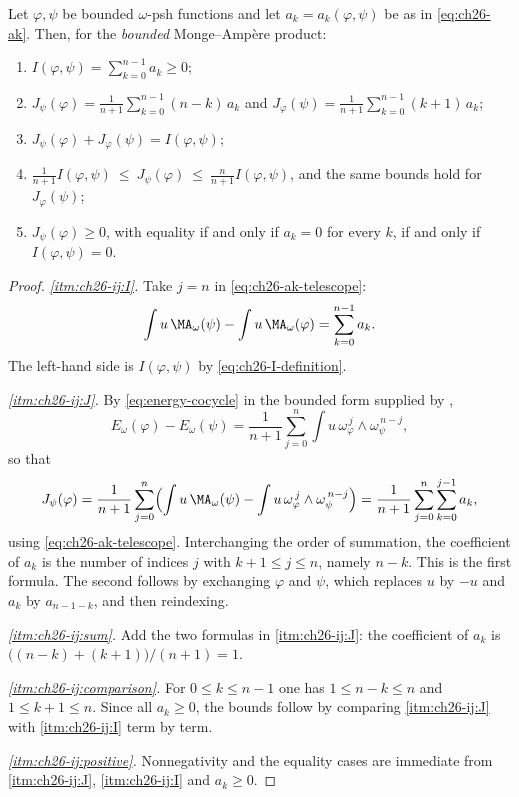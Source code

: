 \begin{theorem}
\label{thm:ch26-mixed-energy-identities}
Let \(\varphi,\psi\) be bounded \(\omega\)-psh functions and let
\(a_k=a_k(\varphi,\psi)\) be as in \eqref{eq:ch26-ak}.  Then, for the
\emph{bounded} Monge--Amp\`ere product:
\begin{enumerate}
\item\label{itm:ch26-ij:I}
 \(\displaystyle I(\varphi,\psi)=\sum_{k=0}^{n-1}a_k\geq0\);
\item\label{itm:ch26-ij:J}
 \(\displaystyle J_\psi(\varphi)=\frac1{n+1}\sum_{k=0}^{n-1}(n-k)\,a_k\)
 and
 \(\displaystyle J_\varphi(\psi)=\frac1{n+1}\sum_{k=0}^{n-1}(k+1)\,a_k\);
\item\label{itm:ch26-ij:sum}
 \(J_\psi(\varphi)+J_\varphi(\psi)=I(\varphi,\psi)\);
\item\label{itm:ch26-ij:comparison}
 \(\displaystyle
 \frac1{n+1}I(\varphi,\psi)\ \leq\ J_\psi(\varphi)\ \leq\
 \frac{n}{n+1}I(\varphi,\psi)\),
 and the same bounds hold for \(J_\varphi(\psi)\);
\item\label{itm:ch26-ij:positive}
 \(J_\psi(\varphi)\geq0\), with equality if and only if \(a_k=0\) for every
 \(k\), if and only if \(I(\varphi,\psi)=0\).
\end{enumerate}
\end{theorem}

\begin{proof}
\emph{\cref{itm:ch26-ij:I}.}  Take \(j=n\) in
\eqref{eq:ch26-ak-telescope}:
\[
 \int u\,\MA_\omega(\psi)-\int u\,\MA_\omega(\varphi)
 =\sum_{k=0}^{n-1}a_k .
\]
The left-hand side is \(I(\varphi,\psi)\) by
\eqref{eq:ch26-I-definition}.

\emph{\cref{itm:ch26-ij:J}.}  By \eqref{eq:energy-cocycle} in the bounded form
supplied by \Cref{prop:bounded-energy-identities},
\[
 E_\omega(\varphi)-E_\omega(\psi)
 =\frac1{n+1}\sum_{j=0}^n\int u\,
   \omega_\varphi^{\,j}\wedge\omega_\psi^{\,n-j},
\]
so that
\[
 J_\psi(\varphi)
 =\frac1{n+1}\sum_{j=0}^n
   \Bigl(\int u\,\MA_\omega(\psi)
        -\int u\,\omega_\varphi^{\,j}\wedge\omega_\psi^{\,n-j}\Bigr)
 =\frac1{n+1}\sum_{j=0}^n\sum_{k=0}^{j-1}a_k ,
\]
using \eqref{eq:ch26-ak-telescope}.  Interchanging the order of summation,
the coefficient of \(a_k\) is the number of indices \(j\) with
\(k+1\leq j\leq n\), namely \(n-k\).  This is the first formula.  The second
follows by exchanging \(\varphi\) and \(\psi\), which replaces \(u\) by
\(-u\) and \(a_k\) by \(a_{n-1-k}\), and then reindexing.

\emph{\cref{itm:ch26-ij:sum}.}  Add the two formulas in
\cref{itm:ch26-ij:J}: the coefficient of \(a_k\) is
\(\bigl((n-k)+(k+1)\bigr)/(n+1)=1\).

\emph{\cref{itm:ch26-ij:comparison}.}  For \(0\leq k\leq n-1\) one has
\(1\leq n-k\leq n\) and \(1\leq k+1\leq n\).  Since all \(a_k\geq0\), the
bounds follow by comparing \cref{itm:ch26-ij:J} with
\cref{itm:ch26-ij:I} term by term.

\emph{\cref{itm:ch26-ij:positive}.}  Nonnegativity and the equality cases are
immediate from \cref{itm:ch26-ij:J}, \cref{itm:ch26-ij:I} and \(a_k\geq0\).
\end{proof}

